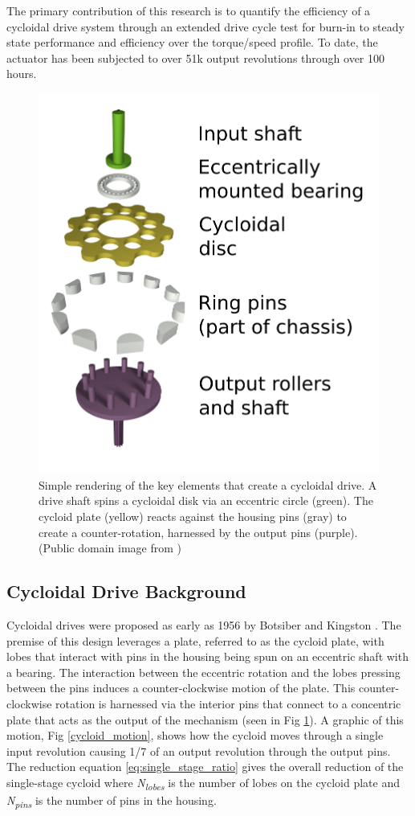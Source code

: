 The primary contribution of this research is to quantify the efficiency of a cycloidal drive system through an extended drive cycle test for burn-in to steady state performance and efficiency over the torque/speed profile.
To date, the actuator has been subjected to over 51k output revolutions through over 100 hours.

\begin{figure}[!b]
   \centering
   \includegraphics[width=0.60\linewidth]{images/Cycloidal_drive_parts}
    \caption{Simple rendering of the key elements that create a cycloidal drive.
   	A drive shaft spins a cycloidal disk via an eccentric circle (green).
   	The cycloid plate (yellow) reacts against the housing pins (gray) to create a counter-rotation, harnessed by the output pins (purple). (Public domain image from \cite{cycloid_cartoon})}
   \label{cycloid_cartoon}
\end{figure}



\subsection{Cycloidal Drive Background}
Cycloidal drives were proposed as early as 1956 by Botsiber and Kingston \cite{1956}.
The premise of this design leverages a plate, referred to as the cycloid plate, with lobes that interact with pins in the housing being spun on an eccentric shaft with a bearing.
The interaction between the eccentric rotation and the lobes pressing between the pins induces a counter-clockwise motion of the plate. This counter-clockwise rotation is harnessed via the interior pins that connect to a concentric plate that acts as the output of the mechanism (seen in Fig \ref{cycloid_cartoon}). A graphic of this motion, Fig \ref{cycloid_motion}, shows how the cycloid moves through a single input revolution causing 1/7 of an output revolution through the output pins. 
The reduction equation \ref{eq:single_stage_ratio} gives the overall reduction of the single-stage cycloid where \textit{N\textsubscript{lobes}} is the number of lobes on the cycloid plate and \textit{N\textsubscript{pins}} is the number of pins in the housing. 

